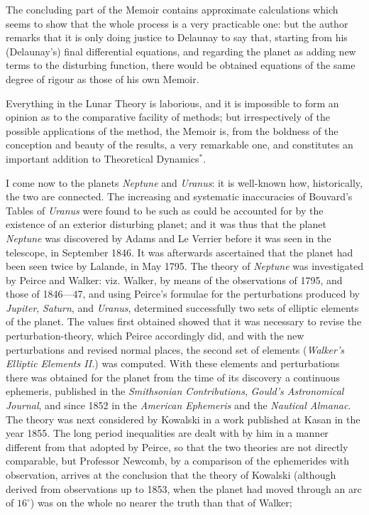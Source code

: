 \documentclass[11pt,a4paper]{book}
\begin{document}
The concluding part of the Memoir contains approximate calculations which seems to show that the whole process is a very practicable one: but the author remarks that it is only doing justice to Delaunay to say that, starting from his (Delaunay's) final differential equations, and regarding the planet as adding new terms to the disturbing function, there would be obtained equations of the same degree of rigour as those of his own Memoir.

Everything in the Lunar Theory is laborious, and it is impossible to form an opinion as to the comparative facility of methods; but irrespectively of the possible applications of the method, the Memoir is, from the boldness of the conception and beauty of the results, a very remarkable one, and constitutes an important addition to Theoretical Dynamics$^*$.

I come now to the planets \textit{Neptune} and \textit{Uranus}: it is well-known how, historically, the two are connected. The increasing and systematic inaccuracies of Bouvard's Tables of \textit{Uranus} were found to be such as could be accounted for by the existence of an exterior disturbing planet; and it was thus that the planet \textit{Neptune} was discovered by Adams and Le Verrier before it was seen in the telescope, in September 1846. It was afterwards ascertained that the planet had been seen twice by Lalande, in May 1795. The theory of \textit{Neptune} was investigated by Peirce and Walker: viz. Walker, by means of the observations of 1795, and those of 1846---47, and using Peirce's formulae for the perturbations produced by \textit{Jupiter}, \textit{Saturn}, and \textit{Uranus}, determined successfully two sets of elliptic elements of the planet. The values first obtained showed that it was necessary to revise the perturbation-theory, which Peirce accordingly did, and with the new perturbations and revised normal places, the second set of elements (\textit{Walker's Elliptic Elements II.}) was computed. With these elements and perturbations there was obtained for the planet from the time of its discovery a continuous ephemeris, published in the \textit{Smithsonian Contributions}, \textit{Gould's Astronomical Journal}, and since 1852 in the \textit{American Ephemeris} and the \textit{Nautical Almanac}. The theory was next considered by Kowalski in a work published at Kasan in the year 1855. The long period inequalities are dealt with by him in a manner different from that adopted by Peirce, so that the two theories are not directly comparable, but Professor Newcomb, by a comparison of the ephemerides with observation, arrives at the conclusion that the theory of Kowalski (although derived from observations up to 1853, when the planet had moved through an arc of $16^{\circ}$) was on the whole no nearer the truth than that of Walker;
\end{document}
